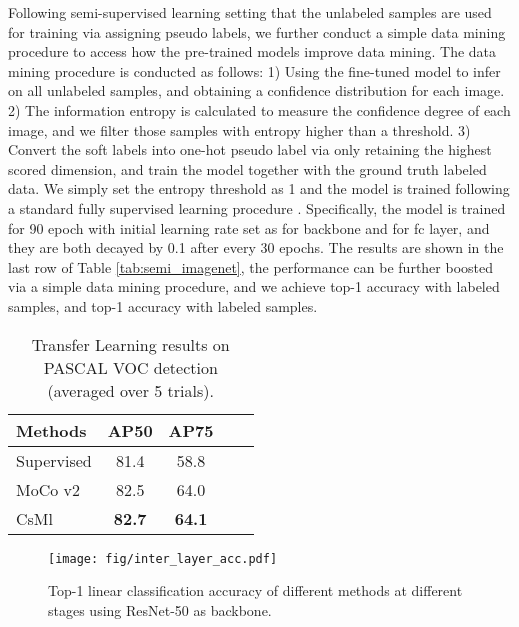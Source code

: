 \documentclass[10pt,twocolumn,letterpaper]{article}
\begin{document}
Following semi-supervised learning setting that the unlabeled samples are used for training via assigning pseudo labels, we further conduct a simple data mining procedure to access how the pre-trained models improve data mining. The data mining procedure is conducted as follows: 1) Using the fine-tuned model to infer on all unlabeled samples, and obtaining a confidence distribution for each image. 2) The information entropy is calculated to measure the confidence degree of each image, and we filter those samples with entropy higher than a threshold. 3) Convert the soft labels into one-hot pseudo label via only retaining the highest scored dimension, and train the model together with the ground truth labeled data.
We simply set the entropy threshold as 1 and the model is trained following a standard fully supervised learning procedure \cite{he2016deep}. Specifically, the model is trained for 90 epoch with initial learning rate set as  for backbone and  for fc layer, and they are both decayed by 0.1 after every 30 epochs. The results are shown in the last row of Table \ref{tab:semi_imagenet}, the performance can be further boosted via a simple data mining procedure, and we achieve  top-1 accuracy with  labeled samples, and  top-1 accuracy with  labeled samples. 

\begin{table}[]
\caption{Transfer Learning results on PASCAL VOC detection (averaged over 5 trials).}
\vspace{0.05in}
\centering
\setlength{\tabcolsep}{5mm}
\begin{tabular}{lcccc}
\toprule
Methods & AP50 & AP75   \\
\midrule
Supervised                  & 81.4  & 58.8  \\
MoCo v2 \cite{chen2020improved}                    & 82.5  & 64.0  \\
CsMl                        & \textbf{82.7}   & \textbf{64.1}        \\
\bottomrule
\end{tabular}
\label{tab: voc_detec}
\end{table}










\begin{figure}
    \centering
    \texttt{[image: fig/inter\_layer\_acc.pdf]}
    \vspace{0.05in}
    \caption{Top-1 linear classification accuracy of different methods at different stages using ResNet-50 as backbone.}
    \label{fig:inter_layer}
    \vspace{-0.2in}
\end{figure}
\end{document}
